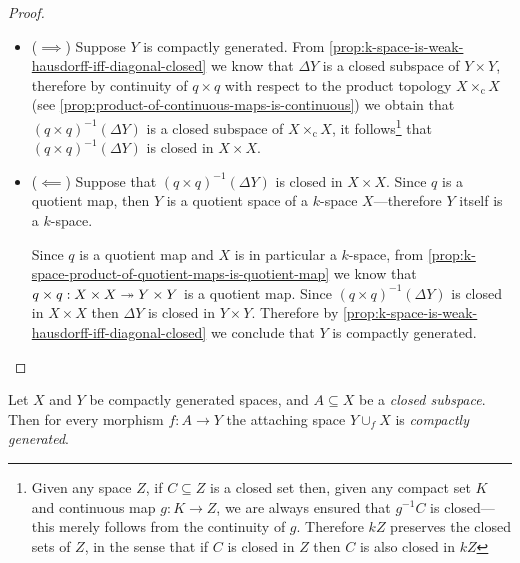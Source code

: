 \begin{proof}
    \begin{itemize}\setlength\itemsep{0em}
        \item (\(\implies\)) Suppose \(Y\) is compactly generated. From
              \cref{prop:k-space-is-weak-hausdorff-iff-diagonal-closed} we know that
              \(\Delta Y\) is a closed subspace of \(Y \times Y\), therefore by continuity
              of \(q \times q\) with respect to the product topology
              \(X \times_{\text{c}} X\) (see
              \cref{prop:product-of-continuous-maps-is-continuous}) we obtain that
              \((q \times q)^{-1}(\Delta Y)\) is a closed subspace of
              \(X \times_{\text{c}} X\), it follows\footnote{ Given any space \(Z\), if
                  \(C \subseteq Z\) is a closed set then, given any compact set \(K\) and
                  continuous map \(g: K \to Z\), we are always ensured that \(g^{-1} C\) is
                  closed---this merely follows from the continuity of \(g\). Therefore \(k Z\)
                  preserves the closed sets of \(Z\), in the sense that if \(C\) is closed in
                  \(Z\) then \(C\) is also closed in \(k Z\) } that
              \((q \times q)^{-1}(\Delta Y)\) is closed in \(X \times X\).

        \item (\(\impliedby\)) Suppose that \((q \times q)^{-1}(\Delta Y)\) is closed in
              \(X \times X\). Since \(q\) is a quotient map, then \(Y\) is a quotient
              space of a \(k\)-space \(X\)---therefore \(Y\) itself is a \(k\)-space.

              Since \(q\) is a quotient map and \(X\) is in particular a \(k\)-space, from
              \cref{prop:k-space-product-of-quotient-maps-is-quotient-map} we know that
              \(q \times q: X \times X \twoheadrightarrow Y \times Y\) is a quotient map. Since
              \((q \times q)^{-1}(\Delta Y)\) is closed in \(X \times X\) then \(\Delta Y\)
              is closed in \(Y \times Y\). Therefore by
              \cref{prop:k-space-is-weak-hausdorff-iff-diagonal-closed} we conclude that
              \(Y\) is compactly generated.
    \end{itemize}
\end{proof}

\begin{proposition}
    \label{prop:attaching-space-compactly-generated}
    Let \(X\) and \(Y\) be compactly generated spaces, and \(A \subseteq X\) be a
    \emph{closed subspace}. Then for every morphism \(f: A \to Y\) the attaching
    space \(Y \cup_f X\) is \emph{compactly generated}.
\end{proposition}

